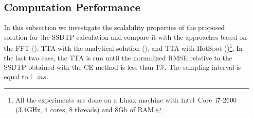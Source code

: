 \subsection{Computation Performance} \label{sec:results-ssdtp}
In this subsection we investigate the scalability properties of the proposed solution for the SSDTP calculation and compare it with the approaches based on the FFT (), TTA with the analytical solution (), and TTA with HotSpot ()\footnote{All the experiments are done on a Linux machine with Intel\textregistered\ Core\texttrademark\ i7-2600 (3.4GHz, 4 cores, 8 threads) and 8Gb of RAM.}. In the last two case, the TTA is run until the normalized RMSE relative to the SSDTP obtained with the CE method is less than 1\%. The sampling interval is equal to \mbox{1 $ms$}.


